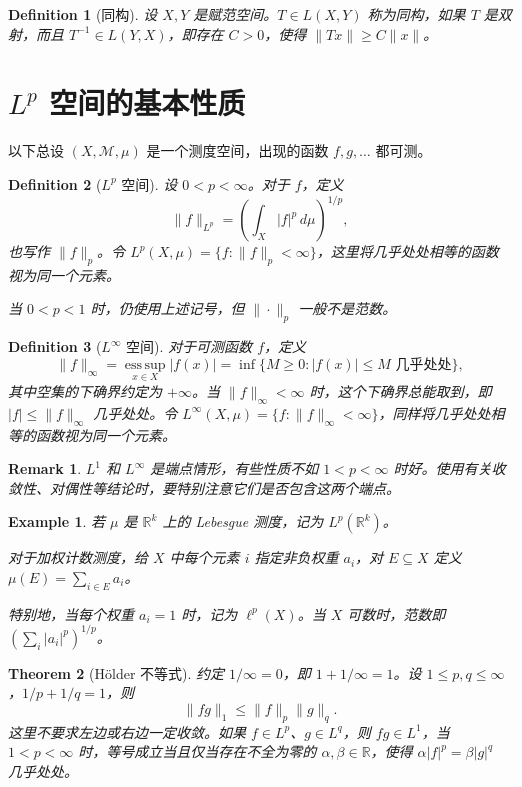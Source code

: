 \documentclass[12pt,letterpaper,twoside,openright]{ctexbook}
\theoremstyle{bluehead}
\newtheorem{theorem}{Theorem}
\theoremstyle{olivehead}
\newtheorem{definition}{Definition}
\theoremstyle{orangehead}
\newtheorem{example}[theorem]{Example}
\theoremstyle{redremark}
\newtheorem*{remark}{Remark}
\begin{document}
\begin{definition}[同构]
设 $X,Y$ 是赋范空间。$T\in L(X,Y)$ 称为同构，如果 $T$ 是双射，而且 $T^{-1}\in L(Y,X)$，即存在 $C>0$，使得 $\|Tx\|\geq C\|x\|$。
\end{definition}
\section{\texorpdfstring{$L^p$}{Lp} 空间的基本性质}
以下总设 $(X,\mathcal M,\mu)$ 是一个测度空间，出现的函数 $f,g,\ldots$ 都可测。

\begin{definition}[\texorpdfstring{$L^p$}{Lp} 空间]
设 $0<p<\infty$。对于 $f$，定义
\[
\|f\|_{L^p}=\left(\int_X|f|^p\,d\mu\right)^{1/p},
\]
也写作 $\|f\|_p$。令 $L^p(X,\mu)=\{f:\|f\|_p<\infty\}$，这里将几乎处处相等的函数视为同一个元素。

当 $0<p<1$ 时，仍使用上述记号，但 $\|\cdot\|_p$ 一般不是范数。
\end{definition}
\begin{definition}[\texorpdfstring{$L^\infty$}{L∞} 空间]
对于可测函数 $f$，定义
\[
\|f\|_\infty=\operatorname*{ess\,sup}_{x\in X}|f(x)|
=\inf\{M\geq0:|f(x)|\leq M\text{ 几乎处处}\},
\]
其中空集的下确界约定为 $+\infty$。当 $\|f\|_\infty<\infty$ 时，这个下确界总能取到，即 $|f|\leq\|f\|_\infty$ 几乎处处。令 $L^\infty(X,\mu)=\{f:\|f\|_\infty<\infty\}$，同样将几乎处处相等的函数视为同一个元素。
\end{definition}

\begin{remark}
$L^1$ 和 $L^\infty$ 是端点情形，有些性质不如 $1<p<\infty$ 时好。使用有关收敛性、对偶性等结论时，要特别注意它们是否包含这两个端点。
\end{remark}

\begin{example}
若 $\mu$ 是 $\mathbb R^k$ 上的 Lebesgue 测度，记为 $L^p(\mathbb R^k)$。

对于加权计数测度，给 $X$ 中每个元素 $i$ 指定非负权重 $a_i$，对 $E\subseteq X$ 定义 $\mu(E)=\sum_{i\in E}a_i$。

特别地，当每个权重 $a_i=1$ 时，记为 $\ell^p(X)$。当 $X$ 可数时，范数即 $\left(\sum_i|a_i|^p\right)^{1/p}$。
\end{example}

\begin{theorem}[Hölder 不等式]\label{thm:holder-lp}
约定 $1/\infty=0$，即 $1+1/\infty=1$。设 $1\leq p,q\leq\infty$，$1/p+1/q=1$，则
\[
\|fg\|_1\leq\|f\|_p\|g\|_q.
\]
这里不要求左边或右边一定收敛。如果 $f\in L^p$、$g\in L^q$，则 $fg\in L^1$，当 $1<p<\infty$ 时，等号成立当且仅当存在不全为零的 $\alpha,\beta\in\mathbb R$，使得 $\alpha|f|^p=\beta|g|^q$ 几乎处处。
\end{theorem}
\end{document}
